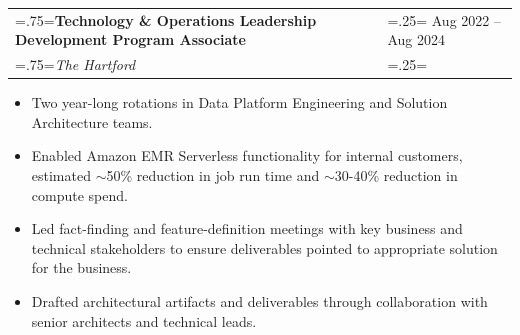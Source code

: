 \documentclass{article}
\begin{document}
\begin{tabularx}{\textwidth}{
    >{\raggedright\arraybackslash\hsize=.75\hsize\linewidth=\hsize}X
    >{\raggedleft\arraybackslash\hsize=.25\hsize\linewidth=\hsize}X }
    \textbf{Technology \& Operations Leadership Development Program Associate} & Aug 2022 -- Aug 2024\\
    \textit{The Hartford} & \\
\end{tabularx}
\vspace{-.5em}
\begin{itemize}[label={•}, leftmargin=1em]
    \setlength\itemsep{0em}
    \item Two year-long rotations in Data Platform Engineering and Solution Architecture teams.
    \item Enabled Amazon EMR Serverless functionality for internal customers, estimated $\sim$50\% reduction in job run time and $\sim$30-40\% reduction in compute spend.
    \item Led fact-finding and feature-definition meetings with key business and technical stakeholders to ensure deliverables pointed to appropriate solution for the business.
    \item Drafted architectural artifacts and deliverables through collaboration with senior architects and technical leads.
\end{itemize}

\end{document}
